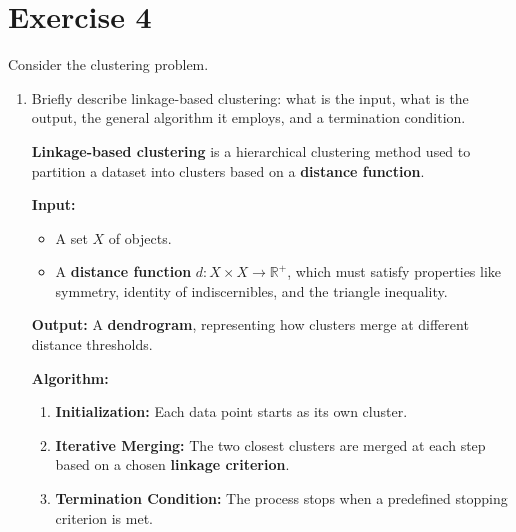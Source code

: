\documentclass[a4paper,11pt,oneside]{book}
\begin{document}
\section{Exercise 4}
    Consider the clustering problem.
    \begin{enumerate}
        \item Briefly describe linkage-based clustering: what is the input, what is the output, the general algorithm it employs, and a termination condition.
            \begin{solution}
                \textbf{Linkage-based clustering} is a hierarchical clustering method used to partition a dataset into clusters based on a \textbf{distance function}. 
                
                \textbf{Input:} 
                \begin{itemize}
                    \item A set $X$ of objects.
                    \item A \textbf{distance function} $d: X \times X \to \mathbb{R}^+$, which must satisfy properties like symmetry, identity of indiscernibles, and the triangle inequality.
                \end{itemize}
                
                \textbf{Output:} 
                A \textbf{dendrogram}, representing how clusters merge at different distance thresholds.
                
                \textbf{Algorithm:}
                \begin{enumerate}
                    \item \textbf{Initialization:} Each data point starts as its own cluster.
                    \item \textbf{Iterative Merging:} The two closest clusters are merged at each step based on a chosen \textbf{linkage criterion}.
                    \item \textbf{Termination Condition:} The process stops when a predefined stopping criterion is met.
                \end{enumerate}
                

\end{solution}
\end{enumerate}
\end{document}
